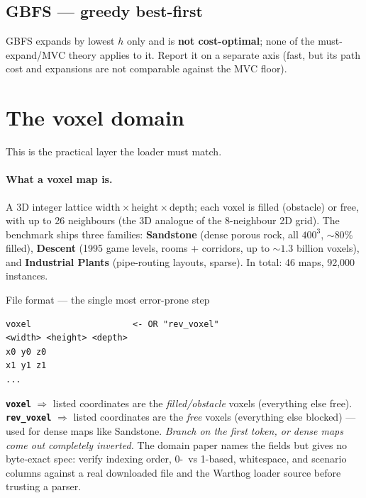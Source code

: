 \documentclass[11pt]{article}
\begin{document}
\subsection{GBFS --- greedy best-first}
GBFS expands by lowest $h$ only and is \textbf{not cost-optimal}; none of the
must-expand/MVC theory applies to it. Report it on a separate axis (fast, but its path cost
and expansions are not comparable against the MVC floor).

\section{The voxel domain \citep{nobes2023voxel}}
\label{sec:voxel}

This is the practical layer the loader must match.

\paragraph{What a voxel map is.} A 3D integer lattice $\text{width}\times\text{height}\times
\text{depth}$; each voxel is filled (obstacle) or free, with up to 26 neighbours (the 3D
analogue of the 8-neighbour 2D grid). The benchmark ships three families: \textbf{Sandstone}
(dense porous rock, all $400^3$, ${\sim}80\%$ filled), \textbf{Descent} (1995 game levels,
rooms + corridors, up to ${\sim}1.3$ billion voxels), and \textbf{Industrial Plants}
(pipe-routing layouts, sparse). In total: 46 maps, 92{,}000 instances.

\begin{keybox}{File format --- the single most error-prone step}
\begin{verbatim}
voxel                    <- OR "rev_voxel"
<width> <height> <depth>
x0 y0 z0
x1 y1 z1
...
\end{verbatim}
\textbf{\texttt{voxel}} $\Rightarrow$ listed coordinates are the \emph{filled/obstacle}
voxels (everything else free). \textbf{\texttt{rev\_voxel}} $\Rightarrow$ listed coordinates
are the \emph{free} voxels (everything else blocked) --- used for dense maps like Sandstone.
\emph{Branch on the first token, or dense maps come out completely inverted.} The domain
paper names the fields but gives no byte-exact spec: verify indexing order, 0-\ vs
1-based, whitespace, and scenario columns against a real downloaded file and the Warthog
loader source before trusting a parser.
\end{keybox}
\end{document}
